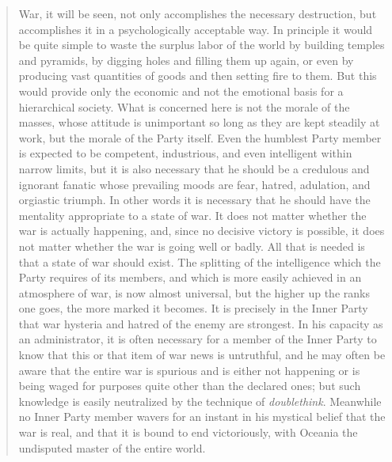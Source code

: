 \begin{paracol}{2}
\switchcolumn*

\begin{quotation}
War, it will be seen, not only accomplishes the necessary destruction,
but accomplishes it in a psychologically acceptable way. In principle it
would be quite simple to waste the surplus labor of the world by
building temples and pyramids, by digging holes and filling them up
again, or even by producing vast quantities of goods and then setting
fire to them. But this would provide only the economic and not the
emotional basis for a hierarchical society. What is concerned here is
not the morale of the masses, whose attitude is unimportant so long as
they are kept steadily at work, but the morale of the Party itself. Even
the humblest Party member is expected to be competent, industrious, and
even intelligent within narrow limits, but it is also necessary that he
should be a credulous and ignorant fanatic whose prevailing moods are
fear, hatred, adulation, and orgiastic triumph. In other words it is
necessary that he should have the mentality appropriate to a state of
war. It does not matter whether the war is actually happening, and,
since no decisive victory is possible, it does not matter whether the
war is going well or badly. All that is needed is that a state of war
should exist. The splitting of the intelligence which the Party requires
of its members, and which is more easily achieved in an atmosphere of
war, is now almost universal, but the higher up the ranks one goes, the
more marked it becomes. It is precisely in the Inner Party that war
hysteria and hatred of the enemy are strongest. In his capacity as an
administrator, it is often necessary for a member of the Inner Party to
know that this or that item of war news is untruthful, and he may often
be aware that the entire war is spurious and is either not happening or
is being waged for purposes quite other than the declared ones; but such
knowledge is easily neutralized by the technique of \emph{doublethink}.
Meanwhile no Inner Party member wavers for an instant in his mystical
belief that the war is real, and that it is bound to end victoriously,
with Oceania the undisputed master of the entire world.
\end{quotation}

\switchcolumn


\end{paracol}
